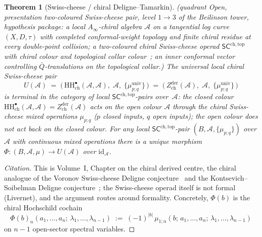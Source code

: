 \documentclass[11pt,reqno]{amsart}
\newtheorem{theorem}{Theorem}[section]
\theoremstyle{definition}
\theoremstyle{remark}
\newcommand{\cA}{\mathcal{A}}
\newcommand{\SCchtop}{\mathsf{SC}^{\mathrm{ch,top}}}
\newcommand{\HH}{\mathrm{HH}}
\newcommand{\Ainf}{A_{\infty}}
\newcommand{\id}{\mathrm{id}}
\numberwithin{equation}{section}
\begin{document}
\begin{theorem}[Swiss-cheese / chiral Deligne--Tamarkin]
\label{thm:swiss-cheese-chiral-DT-standalone}
\textup{(}\emph{quadrant} Open, \emph{presentation} two-coloured
Swiss-cheese pair, \emph{level} $1 \to 3$ of the Beilinson tower,
\emph{hypothesis package}: a local $\Ainf$-chiral algebra $\cA$ on
a tangential log curve $(X, D, \tau)$ with completed
conformal-weight topology and finite chiral residue at every
double-point collision; a two-coloured chiral Swiss-cheese operad
$\SCchtop$ with chiral colour and topological collar
colour~\textup{\cite{Voronov99,KS00}}; an inner conformal vector
controlling $\bar Q$-translations on the topological collar.\textup{)}
The universal local chiral Swiss-cheese pair
\[
  U(\cA) \;=\; \bigl(\,
    \HH^\bullet_{\mathrm{ch}}(\cA, \cA),\; \cA,\;
    \{\mu^{\mathrm{univ}}_{p;q}\}\,\bigr)
  \;=\;
  \bigl(\,Z^{\mathrm{der}}_{\mathrm{ch}}(\cA),\; \cA,\;
  \{\mu^{\mathrm{univ}}_{p;q}\}\,\bigr)
\]
is terminal in the category of local $\SCchtop$-pairs over~$\cA$:
the closed colour $\HH^\bullet_{\mathrm{ch}}(\cA, \cA)
= Z^{\mathrm{der}}_{\mathrm{ch}}(\cA)$ acts on the open colour
$\cA$ through the chiral Swiss-cheese mixed operations
$\mu_{p;q}$ \textup{(}$p$ closed inputs, $q$ open inputs\textup{)};
the open colour does not act back on the closed colour. For any
local $\SCchtop$-pair $(B, \cA, \{\mu_{p;q}\})$ over $\cA$ with
continuous mixed operations there is a unique morphism
$\Phi \colon (B, \cA, \mu) \to U(\cA)$ over $\id_\cA$.
\end{theorem}

\begin{proof}[Citation]
This is Volume~I, Chapter on the chiral derived centre, the chiral
analogue of the Voronov Swiss-cheese Deligne
conjecture~\cite{Voronov99} and the Kontsevich--Soibelman Deligne
conjecture~\cite{KS00}; the Swiss-cheese operad itself is not
formal (Livernet), and the argument routes around formality. Concretely, $\Phi(b)$ is the chiral
Hochschild cochain
\[
  \Phi(b)_n(a_1, \ldots, a_n;\, \lambda_1, \ldots, \lambda_{n-1})
  \;:=\;
  (-1)^{|b|}\,
  \mu_{1;n}(b;\, a_1, \ldots, a_n;\,
    \lambda_1, \ldots, \lambda_{n-1})
\]
on $n - 1$ open-sector spectral variables.
\end{proof}
\end{document}
